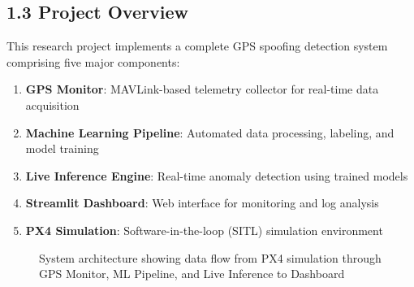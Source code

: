\subsection{1.3 Project Overview}

This research project implements a complete GPS spoofing detection system comprising five major components:

\begin{enumerate}
    \item \textbf{GPS Monitor}: MAVLink-based telemetry collector for real-time data acquisition
    \item \textbf{Machine Learning Pipeline}: Automated data processing, labeling, and model training
    \item \textbf{Live Inference Engine}: Real-time anomaly detection using trained models
    \item \textbf{Streamlit Dashboard}: Web interface for monitoring and log analysis
    \item \textbf{PX4 Simulation}: Software-in-the-loop (SITL) simulation environment
\end{enumerate}

\begin{figure}[htbp]
    \centering
    \caption{System architecture showing data flow from PX4 simulation through GPS Monitor, ML Pipeline, and Live Inference to Dashboard}
    \label{fig:system_architecture}
\end{figure}

